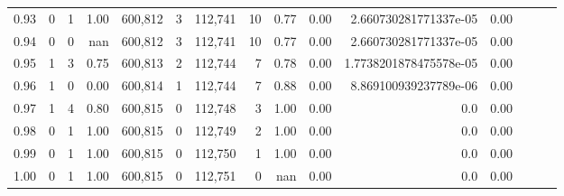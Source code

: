 \begin{tabular}{rrrrrrrrrrrrrrr}
0.93 &       0 &      1 &  1.00 &  600,812 &        3 &  112,741 &       10 &  0.77 &  0.00 &   2.660730281771337e-05 &      0.00 \\
0.94 &       0 &      0 &   nan &  600,812 &        3 &  112,741 &       10 &  0.77 &  0.00 &   2.660730281771337e-05 &      0.00 \\
0.95 &       1 &      3 &  0.75 &  600,813 &        2 &  112,744 &        7 &  0.78 &  0.00 &  1.7738201878475578e-05 &      0.00 \\
0.96 &       1 &      0 &  0.00 &  600,814 &        1 &  112,744 &        7 &  0.88 &  0.00 &   8.869100939237789e-06 &      0.00 \\
0.97 &       1 &      4 &  0.80 &  600,815 &        0 &  112,748 &        3 &  1.00 &  0.00 &                     0.0 &      0.00 \\
0.98 &       0 &      1 &  1.00 &  600,815 &        0 &  112,749 &        2 &  1.00 &  0.00 &                     0.0 &      0.00 \\
0.99 &       0 &      1 &  1.00 &  600,815 &        0 &  112,750 &        1 &  1.00 &  0.00 &                     0.0 &      0.00 \\
1.00 &       0 &      1 &  1.00 &  600,815 &        0 &  112,751 &        0 &   nan &  0.00 &                     0.0 &      0.00 \\
\bottomrule
\end{tabular}
